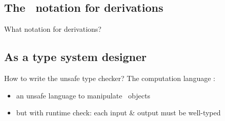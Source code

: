 \subsection{The \LF\ notation for derivations}

\begin{frame}{What notation for derivations?}
\end{frame}

\subsection{As a type system designer}

\begin{frame}{How to write the unsafe type checker?}
  The computation language \CL:
  \begin{itemize}
  \item an unsafe language to manipulate \LF\ objects
  \item but with runtime check: each input \& output must be well-typed
  \end{itemize}
\end{frame}


